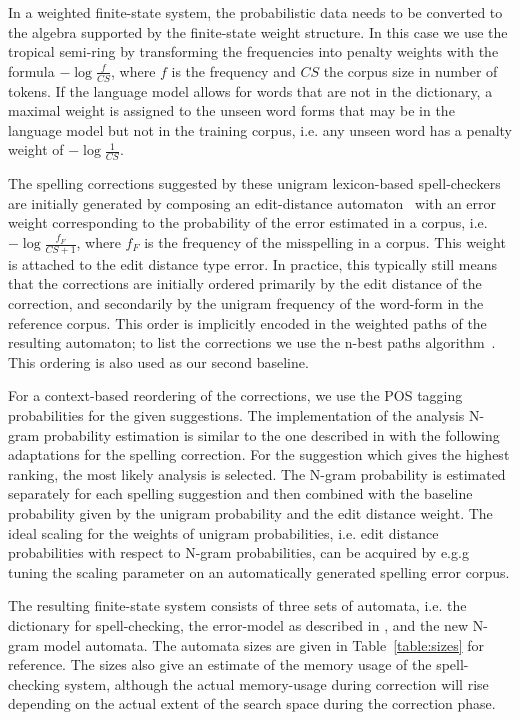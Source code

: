 \documentclass{llncs}
\begin{document}
In a weighted finite-state system, the probabilistic data needs to be converted
to the algebra supported by the finite-state weight structure.  In this case we
use the tropical semi-ring by transforming the frequencies into penalty weights
with the formula $-\log\frac{f}{CS}$, where $f$ is the frequency and $CS$ the
corpus size in number of tokens. If the language model allows for words that
are not in the dictionary, a maximal weight is assigned to the unseen word
forms that may be in the language model but not in the training corpus, i.e.
any unseen word has a penalty weight of $-\log\frac{1}{CS}$.

The spelling corrections suggested by these unigram lexicon-based
spell-checkers are initially generated by composing an edit-distance
automaton~\cite{agata/2002} with an error weight corresponding to the
probability of the error estimated in a corpus, i.e. $-\log\frac{f_{F}}{CS+1}$,
where $f_F$ is the frequency of the misspelling in a corpus. This weight is
attached to the edit distance type error. In practice, this typically still
means that the corrections are initially ordered primarily by the edit distance
of the correction, and secondarily by the unigram frequency of the word-form in
the reference corpus.  This order is implicitly encoded in the weighted paths
of the resulting automaton; to list the corrections we use the n-best paths
algorithm~\cite{mohri/2002}. This ordering is also used as our second baseline.

For a context-based reordering of the corrections, we use the POS tagging
probabilities for the given suggestions. The implementation of the analysis
N-gram probability estimation is similar to the one described in
\cite{silfverberg/2011} with the following adaptations for the spelling
correction. For the suggestion which gives the highest ranking, the most likely
analysis is selected.  The N-gram probability is estimated separately for each
spelling suggestion and then combined with the baseline probability given by
the unigram probability and the edit distance weight. The ideal scaling for the
weights of unigram probabilities, i.e.  edit distance probabilities with
respect to N-gram probabilities, can be acquired by e.g.g tuning the scaling
parameter on an automatically generated spelling error corpus.


The resulting finite-state system consists of three sets of automata, i.e. the
dictionary for spell-checking, the error-model as described in
\cite{pirinen/2010/lrec}, and the new N-gram model automata. The automata sizes
are given in Table~\ref{table:sizes} for reference. The sizes also give an
estimate of the memory usage of the spell-checking system, although the actual
memory-usage during correction will rise depending on the actual extent of the
search space during the correction phase.
\end{document}
